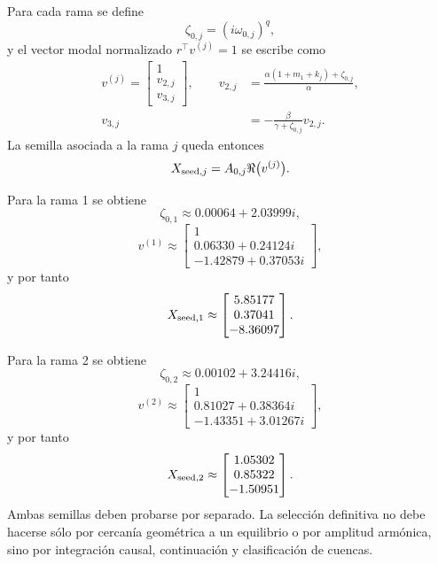\documentclass[journal]{IEEEtran}
\begin{document}
Para cada rama se define
\begin{equation}
\label{eq:zeta_branch_ns}
\zeta_{0,j}=(i\omega_{0,j})^q,
\end{equation}
y el vector modal normalizado $r^\top v^{(j)}=1$ se escribe como
\begin{equation}
\label{eq:v_branch_ns}
\begin{aligned}
v^{(j)}=
\begin{bmatrix}
1\\
v_{2,j}\\
v_{3,j}
\end{bmatrix},
\qquad
v_{2,j}&=\frac{\alpha(1+m_1+k_j)+\zeta_{0,j}}{\alpha},\\
v_{3,j}&=-\frac{\beta}{\gamma+\zeta_{0,j}}v_{2,j}.
\end{aligned}
\end{equation}
La semilla asociada a la rama $j$ queda entonces
\begin{equation}
\label{eq:Xseed_branch_ns}
X_{{\rm seed},j}=A_{0,j}\Re\bigl(v^{(j)}\bigr).
\end{equation}

Para la rama 1 se obtiene
\begin{equation}
\label{eq:zeta_v_seed_ns_1}
\zeta_{0,1}\approx0.00064+2.03999i,
\end{equation}
\begin{equation}
\label{eq:v_ns_1}
v^{(1)}\approx
\begin{bmatrix}
1\\
0.06330+0.24124i\\
-1.42879+0.37053i
\end{bmatrix},
\end{equation}
y por tanto
\begin{equation}
\label{eq:seed_ns_1}
X_{{\rm seed},1}\approx
\begin{bmatrix}
5.85177\\
0.37041\\
-8.36097
\end{bmatrix}.
\end{equation}

Para la rama 2 se obtiene
\begin{equation}
\label{eq:zeta_v_seed_ns_2}
\zeta_{0,2}\approx0.00102+3.24416i,
\end{equation}
\begin{equation}
\label{eq:v_ns_2}
v^{(2)}\approx
\begin{bmatrix}
1\\
0.81027+0.38364i\\
-1.43351+3.01267i
\end{bmatrix},
\end{equation}
y por tanto
\begin{equation}
\label{eq:seed_ns_2}
X_{{\rm seed},2}\approx
\begin{bmatrix}
1.05302\\
0.85322\\
-1.50951
\end{bmatrix}.
\end{equation}
Ambas semillas deben probarse por separado. La selección definitiva no debe hacerse sólo por cercanía geométrica a un equilibrio o por amplitud armónica, sino por integración causal, continuación y clasificación de cuencas.
\end{document}
